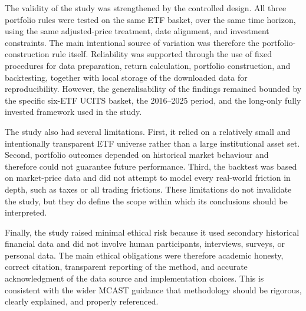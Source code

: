 \par The validity of the study was strengthened by the controlled design. All three portfolio rules were tested on the same ETF basket, over the same time horizon, using the same adjusted-price treatment, date alignment, and investment constraints. The main intentional source of variation was therefore the portfolio-construction rule itself. Reliability was supported through the use of fixed procedures for data preparation, return calculation, portfolio construction, and backtesting, together with local storage of the downloaded data for reproducibility. However, the generalisability of the findings remained bounded by the specific six-ETF UCITS basket, the 2016–2025 period, and the long-only fully invested framework used in the study.
\par The study also had several limitations. First, it relied on a relatively small and intentionally transparent ETF universe rather than a large institutional asset set. Second, portfolio outcomes depended on historical market behaviour and therefore could not guarantee future performance. Third, the backtest was based on market-price data and did not attempt to model every real-world friction in depth, such as taxes or all trading frictions. These limitations do not invalidate the study, but they do define the scope within which its conclusions should be interpreted.
\par Finally, the study raised minimal ethical risk because it used secondary historical financial data and did not involve human participants, interviews, surveys, or personal data. The main ethical obligations were therefore academic honesty, correct citation, transparent reporting of the method, and accurate acknowledgment of the data source and implementation choices. This is consistent with the wider MCAST guidance that methodology should be rigorous, clearly explained, and properly referenced.
